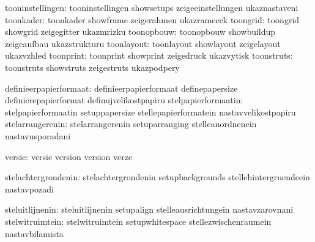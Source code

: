              tooninstellingen:  tooninstellingen             showsetups
                                zeigeeinstellungen           ukaznastaveni
                    toonkader:  toonkader                    showframe
                                zeigerahmen                  ukazramecek
                     toongrid:  toongrid                     showgrid
                                zeigegitter                  ukazmrizku
                   toonopbouw:  toonopbouw                   showbuildup
                                zeigeaufbau                  ukazstrukturu
                   toonlayout:  toonlayout                   showlayout
                                zeigelayout                  ukazvzhled
                    toonprint:  toonprint                    showprint
                                zeigedruck                   ukazvytisk
                   toonstruts:  toonstruts                   showstruts
                                zeigestruts                  ukazpodpery

       definieerpapierformaat:  definieerpapierformaat       definepapersize
                                definierepapierformat        definujvelikostpapiru
          stelpapierformaatin:  stelpapierformaatin          setuppapersize
                                stellepapierformatein        nastavvelikostpapiru
             stelarrangerenin:  stelarrangerenin             setuparranging
                                stelleanordnenein            nastavusporadani

                       versie:  versie                       version
                                version                      verze

          stelachtergrondenin:  stelachtergrondenin          setupbackgrounds
                                stellehintergruendeein       nastavpozadi

              steluitlijnenin:  steluitlijnenin              setupalign
                                stelleausrichtungein         nastavzarovnani
              stelwitruimtein:  stelwitruimtein              setupwhitespace
                                stellezwischenraumein        nastavbilamista

